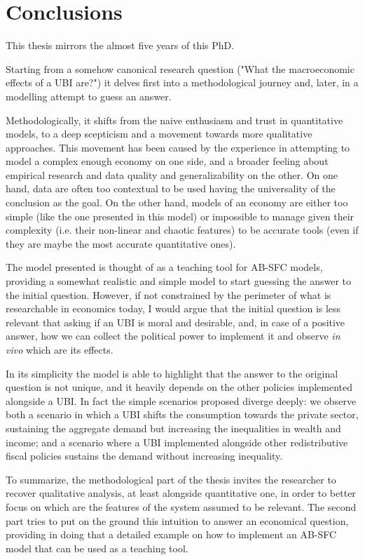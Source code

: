 \chapter*{Conclusions}

This thesis mirrors the almost five years of this PhD.

Starting from a somehow canonical research question ("What the macroeconomic effects of a UBI are?") it delves first into a methodological journey and, later, in a modelling attempt to guess an answer.

Methodologically, it shifts from the naive enthusiasm and trust in quantitative models, to a deep scepticism and a movement towards more qualitative approaches.
This movement has been caused by the experience in attempting to model a complex enough economy on one side, and a broader feeling about empirical research and data quality and generalizability on the other.
On one hand, data are often too contextual to be used having the universality of the conclusion as the goal. On the other hand, models of an economy are either too simple (like the one presented in this model) or impossible to manage given their complexity (i.e. their non-linear and chaotic features) to be accurate tools (even if they are maybe the most accurate quantitative ones).

The model presented is thought of as a teaching tool for AB-SFC models, providing a somewhat realistic and simple model to start guessing the answer to the initial question.
However, if not constrained by the perimeter of what is researchable in economics today, I would argue that the initial question is less relevant that asking if an UBI is moral and desirable, and, in case of a positive answer, how we can collect the political power to implement it and observe \textit{in vivo} which are its effects.

In its simplicity the model is able to highlight that the answer to the original question is not unique, and it heavily depends on the other policies implemented alongside a UBI.
In fact the simple scenarios proposed diverge deeply: we observe both a scenario in which a UBI shifts the consumption towards the private sector, sustaining the aggregate demand but increasing the inequalities in wealth and income; and a scenario where a UBI implemented alongside other redistributive fiscal policies sustains the demand without increasing inequality.

To summarize, the methodological part of the thesis invites the researcher to recover qualitative analysis, at least alongside quantitative one, in order to better focus on which are the features of the system assumed to be relevant.
The second part tries to put on the ground this intuition to answer an economical question, providing in doing that a detailed example on how to implement an AB-SFC model that can be used as a teaching tool.
